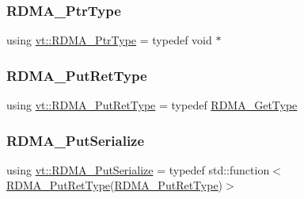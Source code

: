 \mbox{\label{namespacevt_a9e2c953286c7616f7c218e9951790776}} 
\subsubsection{\texorpdfstring{R\+D\+M\+A\+\_\+\+Ptr\+Type}{RDMA\_PtrType}}
{\footnotesize\ttfamily using \hyperlink{namespacevt_a9e2c953286c7616f7c218e9951790776}{vt\+::\+R\+D\+M\+A\+\_\+\+Ptr\+Type} = typedef void $\ast$}

\mbox{\label{namespacevt_a50fcc3338d68f7b147b99c0a82ec3a10}} 
\subsubsection{\texorpdfstring{R\+D\+M\+A\+\_\+\+Put\+Ret\+Type}{RDMA\_PutRetType}}
{\footnotesize\ttfamily using \hyperlink{namespacevt_a50fcc3338d68f7b147b99c0a82ec3a10}{vt\+::\+R\+D\+M\+A\+\_\+\+Put\+Ret\+Type} = typedef \hyperlink{namespacevt_a1cab7f4860f65a49ad2c042d6240f288}{R\+D\+M\+A\+\_\+\+Get\+Type}}

\mbox{\label{namespacevt_abeb0129c92a5721f6f2c01b621f149fe}} 
\subsubsection{\texorpdfstring{R\+D\+M\+A\+\_\+\+Put\+Serialize}{RDMA\_PutSerialize}}
{\footnotesize\ttfamily using \hyperlink{namespacevt_abeb0129c92a5721f6f2c01b621f149fe}{vt\+::\+R\+D\+M\+A\+\_\+\+Put\+Serialize} = typedef std\+::function$<$\hyperlink{namespacevt_a50fcc3338d68f7b147b99c0a82ec3a10}{R\+D\+M\+A\+\_\+\+Put\+Ret\+Type}(\hyperlink{namespacevt_a50fcc3338d68f7b147b99c0a82ec3a10}{R\+D\+M\+A\+\_\+\+Put\+Ret\+Type})$>$}

\mbox{\label{namespacevt_a9bf03a57102d0274cc229b9ef94bb59e}} 
